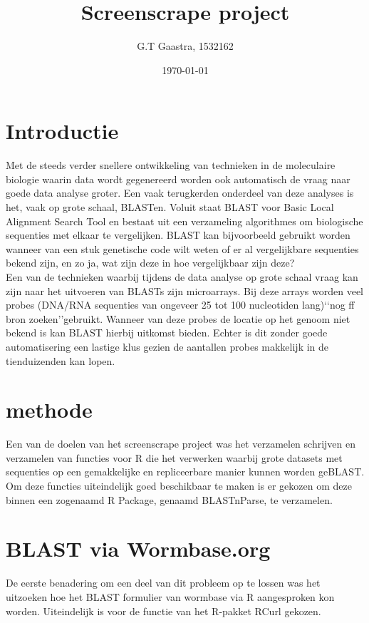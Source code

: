 \documentclass[a4paper]{article}
\title{Screenscrape project}
\author{G.T Gaastra, 1532162}
\date{\today}
\begin{document}
\maketitle

\section{Introductie}
Met de steeds verder snellere ontwikkeling van technieken in de moleculaire biologie waarin data wordt gegenereerd worden ook automatisch de vraag naar goede data analyse groter. Een vaak terugkerden onderdeel van deze analyses is het, vaak op grote schaal, BLASTen. Voluit staat BLAST voor Basic Local Alignment Search Tool en bestaat uit een verzameling algorithmes om biologische sequenties met elkaar te vergelijken. BLAST kan bijvoorbeeld gebruikt worden wanneer van een stuk genetische code wilt weten of er al vergelijkbare sequenties bekend zijn, en zo ja, wat zijn deze in hoe vergelijkbaar zijn deze?\\

Een van de technieken waarbij tijdens de data analyse op grote schaal vraag kan zijn naar het uitvoeren van BLASTs zijn microarrays. Bij deze arrays worden veel probes (DNA/RNA sequenties van ongeveer 25 tot 100 nucleotiden lang)\lq\lq nog ff bron zoeken\rq\rq gebruikt. Wanneer van deze probes de locatie op het genoom niet bekend is kan BLAST hierbij uitkomst bieden. Echter is dit zonder goede automatisering een lastige klus gezien de aantallen probes makkelijk in de tienduizenden kan lopen. 
\section*{methode}
Een van de doelen van het screenscrape project was het verzamelen schrijven en verzamelen van functies voor R\cite{Rcran} die het verwerken waarbij grote datasets met sequenties op een gemakkelijke en repliceerbare manier kunnen worden geBLAST.  Om deze functies uiteindelijk goed beschikbaar te maken is er gekozen om deze binnen een zogenaamd R Package, genaamd BLASTnParse, te verzamelen.
\section{BLAST via Wormbase.org}
De eerste benadering om een deel van dit probleem op te lossen was het uitzoeken hoe het BLAST formulier van wormbase\cite{Wormbase} via R aangesproken kon worden. Uiteindelijk is voor de functie  van het R-pakket RCurl gekozen.
\end{document}
